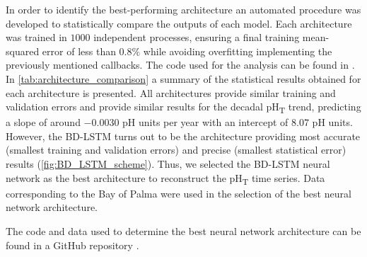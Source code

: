 \noindent In order to identify the best-performing architecture an
automated procedure was developed to statistically compare the outputs of each
model. Each architecture was trained in $1000$ independent processes, ensuring
a final training mean-squared error of less than $0.8\%$ while avoiding
overfitting implementing the previously mentioned callbacks. The code used for
the analysis can be found in \cite{CODE}.\\
In \cref{tab:architecture_comparison} a summary of the statistical results
obtained for each architecture is presented. All architectures provide similar
training and validation errors and provide similar results for the decadal
pH\textsubscript{T} trend, predicting a slope of around $-0.0030$ pH units per
year with an intercept of $8.07$ pH units. However, the BD-LSTM turns out to be
the architecture providing most accurate (smallest training and validation
errors) and precise (smallest statistical error) results
(\cref{fig:BD_LSTM_scheme}). Thus, we selected the BD-LSTM neural network as
the best architecture to reconstruct the pH\textsubscript{T} time series.
Data corresponding to the Bay of Palma were used in the selection of the
best neural network architecture.

\begin{table}[H]
    \centering
    \caption{Statistical comparison between different RNN architectures}
    \label{tab:architecture_comparison}
\end{table}

\noindent The code and data used to determine the best neural network
architecture can be found in a GitHub repository \cite{CODE_ph}.
